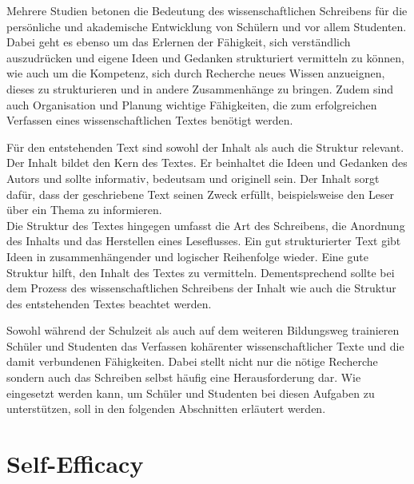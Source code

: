 \documentclass[../main.tex]{subfiles}
\begin{document}
Mehrere Studien betonen die Bedeutung des wissenschaftlichen Schreibens für die persönliche und akademische Entwicklung 
von Schülern und vor allem Studenten\cite{influencingUsingAi,ZukunftWissenschaftlichesPublizieren}. Dabei geht es ebenso um das Erlernen der Fähigkeit, sich verständlich auszudrücken und 
eigene Ideen und Gedanken strukturiert vermitteln zu können, wie auch um die Kompetenz, sich durch Recherche neues Wissen 
anzueignen, dieses zu strukturieren und in andere Zusammenhänge zu bringen. Zudem sind auch Organisation und Planung 
wichtige Fähigkeiten, die zum erfolgreichen Verfassen eines wissenschaftlichen Textes benötigt werden.\cite{SelfEfficacyBeliefs} 

Für den entstehenden Text sind sowohl der Inhalt als auch die Struktur relevant. Der Inhalt bildet den Kern des Textes. Er beinhaltet die Ideen und Gedanken des Autors und sollte 
informativ, bedeutsam und originell sein. Der Inhalt sorgt dafür, dass der geschriebene Text seinen Zweck erfüllt, beispielsweise 
den Leser über ein Thema zu informieren. \\
Die Struktur des Textes hingegen umfasst die Art des Schreibens, die Anordnung des Inhalts und das Herstellen eines Leseflusses. 
Ein gut strukturierter Text gibt Ideen in zusammenhängender und logischer Reihenfolge wieder. Eine gute Struktur hilft, den Inhalt des
Textes zu vermitteln. Dementsprechend sollte bei dem Prozess des wissenschaftlichen Schreibens der Inhalt wie auch die Struktur des entstehenden 
Textes beachtet werden.\cite{teachers}

Sowohl während der Schulzeit als auch auf dem weiteren Bildungsweg trainieren Schüler und Studenten das Verfassen kohärenter 
wissenschaftlicher Texte und die damit verbundenen Fähigkeiten. Dabei stellt nicht nur die nötige Recherche sondern auch das Schreiben selbst
häufig eine Herausforderung dar. Wie  eingesetzt werden kann, um Schüler und Studenten bei diesen Aufgaben zu 
unterstützen, soll in den folgenden Abschnitten erläutert werden. 

\section{Self-Efficacy}
\end{document}
